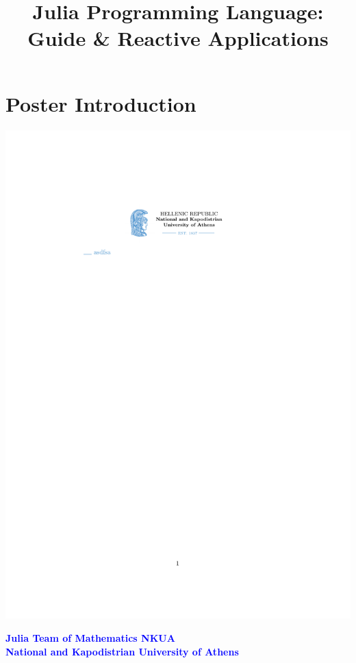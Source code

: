 \documentclass[slidestop,compress,mathserif]{beamer}
\title[]{Julia Programming Language: \\ Guide \&
Reactive Applications}
\author[]{ 
}
\date{}
\begin{document}
\section{Poster Introduction}

\begin{frame}
	\vskip -0.5cm
	\titlepage %
	\vspace{-2.5cm}
	\hspace{60pt}	\href{https://www.math.uoa.gr}{\includegraphics[scale=0.8]{ekpa_logo.pdf}}
	\begin{center}
	   \textcolor{blue}{\scriptsize \textbf{Julia Team of Mathematics NKUA \\
                     National and Kapodistrian University of Athens } }
                      \hyperlink{target2}{}
	\end{center}
    
\end{frame}
\end{document}
